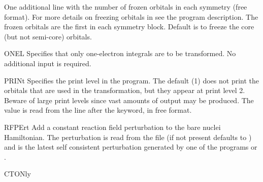 \begin{keywordlist}
One additional line with the number of frozen
orbitals in each symmetry (free format). For more details on freezing
orbitals in  see the program description. The frozen
orbitals are the first in each symmetry block.
Default is to freeze the core (but not semi-core) orbitals.
\item[ONEL]
Specifies that only one-{}electron integrals are to be transformed.
No additional input is required.
\item[PRINt]
Specifies the print level in the program. The default (1) does not
print the orbitals that are used in the transformation, but they
appear at print level 2. Beware of large print levels since vast amounts
of output may be produced. The value is read from the line after the
keyword, in free format.
\item[RFPErt]
Add a constant reaction field perturbation to the bare nuclei Hamiltonian.
The perturbation is read from the file  (if not present defaults to ) and
is the latest self consistent perturbation generated
by one of the programs  or .
\item[CTONly]

\end{keywordlist}
